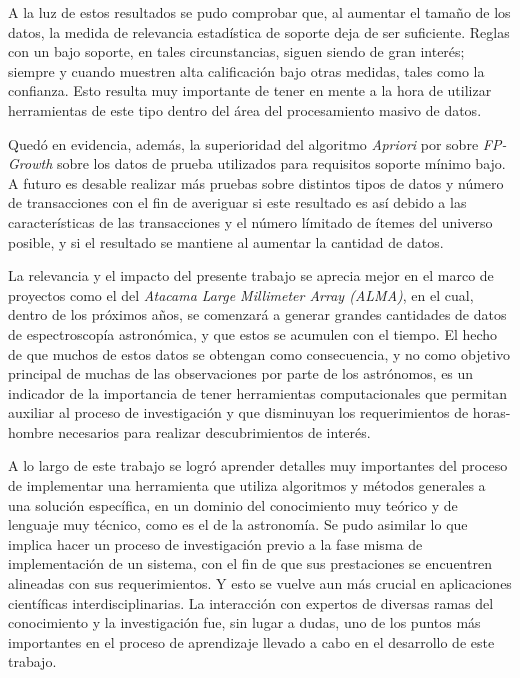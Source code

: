 \begin{conclusion}
A la luz de estos resultados se pudo comprobar que, al aumentar el tamaño de los datos, la medida de relevancia estadística de soporte deja de ser suficiente. Reglas con un bajo soporte, en tales circunstancias, siguen siendo de gran interés; siempre y cuando muestren alta calificación bajo otras medidas, tales como la confianza. Esto resulta muy importante de tener en mente a la hora de utilizar herramientas de este tipo dentro del área del procesamiento masivo de datos.

Quedó en evidencia, además, la superioridad del algoritmo \textit{Apriori} por sobre \textit{FP-Growth} sobre los datos de prueba utilizados para requisitos soporte mínimo bajo. A futuro es desable realizar más pruebas sobre distintos tipos de datos y número de transacciones con el fin de averiguar si este resultado es así debido a las características de las transacciones y el número límitado de ítemes del universo posible, y si el resultado se mantiene al aumentar la cantidad de datos.

La relevancia y el impacto del presente trabajo se aprecia mejor en el marco de proyectos como el del \textit{Atacama Large Millimeter Array (ALMA)}, en el cual, dentro de los próximos años, se comenzará a generar grandes cantidades de datos de espectroscopía astronómica, y que estos se acumulen con el tiempo. El hecho de que muchos de estos datos se obtengan como consecuencia, y no como objetivo principal de muchas de las observaciones por parte de los astrónomos, es un indicador de la importancia de tener herramientas computacionales que permitan auxiliar al proceso de investigación y que disminuyan los requerimientos de horas-hombre necesarios para realizar descubrimientos de interés.

A lo largo de este trabajo se logró aprender detalles muy importantes del proceso de implementar una herramienta que utiliza algoritmos y métodos generales a una solución específica, en un dominio del conocimiento muy teórico y de lenguaje muy técnico, como es el de la astronomía. Se pudo asimilar lo que implica hacer un proceso de investigación previo a la fase misma de implementación de un sistema, con el fin de que sus prestaciones se encuentren alineadas con sus requerimientos. Y esto se vuelve aun más crucial en aplicaciones científicas interdisciplinarias. La interacción con expertos de diversas ramas del conocimiento y la investigación fue, sin lugar a dudas, uno de los puntos más importantes en el proceso de aprendizaje llevado a cabo en el desarrollo de este trabajo.


\end{conclusion}
